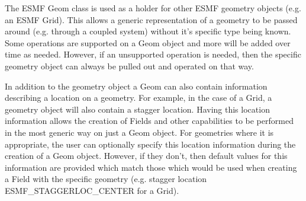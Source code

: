 %

The ESMF Geom class is used as a holder for other ESMF geometry objects (e.g. an ESMF Grid). This allows a generic
representation of a geometry to be passed around (e.g. through a coupled system) without it's specific type being known.
Some operations are supported on a Geom object and more will be added over time as needed. However, if
an unsupported operation is needed, then the specific geometry object can always be pulled out and operated on that way.

In addition to the geometry object a Geom can also contain information describing a location on a geometry. For example, in the case of
a Grid, a geometry object will also contain a stagger location. Having this location information allows the creation of Fields and
other capabilities to be performed in the most generic way on just a Geom object. For geometries where it is appropriate, the user can
optionally specify this location information during the creation of a Geom object. However, if they don't, then default values for
this information are provided which match those which would be used when creating a Field with the specific geometry
(e.g. stagger location ESMF\_STAGGERLOC\_CENTER for a Grid).
